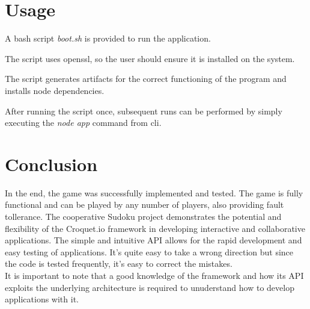 \documentclass[12pt, a4paper]{report}
\begin{document}
\chapter{Usage}
A bash script \emph{boot.sh} is provided to run the application.

The script uses openssl, so the user should ensure it is installed on the system.

The script generates artifacts for the correct functioning of the program and installs node dependencies.

After running the script once, subsequent runs can be performed by simply executing the \emph{node app} command from cli.

\chapter{Conclusion}
In the end, the game was successfully implemented and tested. The game is fully functional and can be played by any number of players, also providing fault tollerance. The cooperative Sudoku project demonstrates the potential and flexibility of the Croquet.io framework in developing interactive and collaborative applications. The simple and intuitive API allows for the rapid development and easy testing of applications. It's quite easy to take a wrong direction but since the code is tested frequently, it's easy to correct the mistakes.\\
It is important to note that a good knowledge of the framework and how its API exploits the underlying architecture is required to unuderstand how to develop applications with it.



\end{document}
